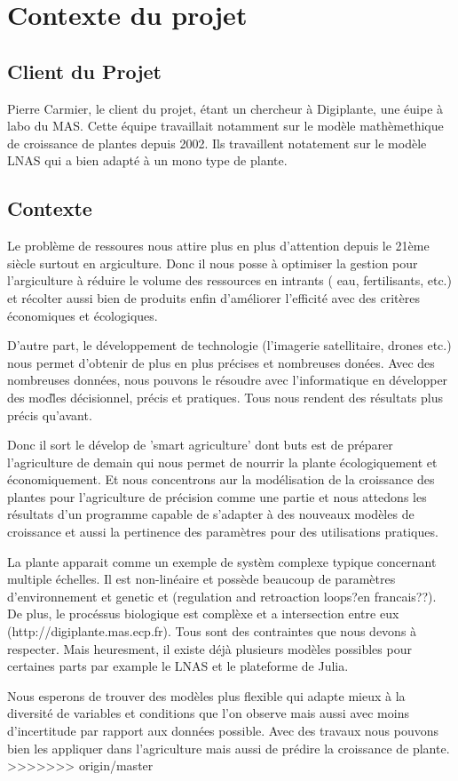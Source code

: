 \section{Contexte du projet}

\subsection{Client du Projet}

Pierre Carmier, le client du projet, \'etant un chercheur à Digiplante, une \'euipe à labo du MAS. Cette \'equipe travaillait notamment sur le mod\`ele math\`emethique de croissance de plantes depuis 2002. Ils travaillent notatement sur le mod\`ele LNAS qui a bien adapt\'e \`a un mono type de plante.
\subsection{Contexte}

Le probl\`eme de ressoures nous attire plus en plus d'attention depuis le 21\`eme si\`ecle surtout en argiculture. Donc il nous posse \`a optimiser la gestion pour l'argiculture \`a r\'eduire le volume des ressources en intrants ( eau, fertilisants, etc.) et r\'ecolter aussi bien de produits enfin d'am\'eliorer l'efficit\'e avec des crit\`eres \'economiques et \'ecologiques.

D'autre part, le d\'eveloppement de technologie (l'imagerie satellitaire, drones etc.) nous permet d'obtenir de plus en plus pr\'ecises et nombreuses don\'ees. Avec des nombreuses donn\'ees, nous pouvons le r\'esoudre avec l'informatique en d\'evelopper des mod\`les d\'ecisionnel, pr\'ecis et pratiques. Tous nous rendent des r\'esultats plus pr\'ecis qu'avant.

Donc il sort le d\'evelop de 'smart agriculture' dont buts est de pr\'eparer l'agriculture de demain qui nous permet de nourrir la plante \'ecologiquement et  \'economiquement. Et nous concentrons aur la mod\'elisation de la croissance des plantes pour l'agriculture de pr\'ecision comme une partie et nous attedons les r\'esultats d'un programme capable de s'adapter \`a des nouveaux mod\`eles de croissance et aussi la pertinence des param\`etres pour des utilisations pratiques. 

La plante apparait comme un exemple de syst\`em complexe typique concernant multiple \'echelles. Il est non-lin\'eaire et poss\`ede beaucoup de param\`etres d'environnement et genetic et (regulation and retroaction loops?en francais??). De plus,  le proc\'essus biologique est compl\`exe et a intersection entre eux (http://digiplante.mas.ecp.fr). Tous sont des contraintes que nous devons \`a respecter. Mais heuresment, il existe d\'ej\`a plusieurs mod\`eles possibles pour certaines parts par example le LNAS et le plateforme de Julia.

Nous esperons de trouver des mod\`eles plus flexible qui adapte mieux \`a la diversit\'e de variables et conditions que l'on observe mais aussi avec moins d'incertitude par rapport aux donn\'ees possible. Avec des travaux nous pouvons bien les appliquer dans l'agriculture mais aussi de pr\'edire la croissance de plante.
>>>>>>> origin/master
